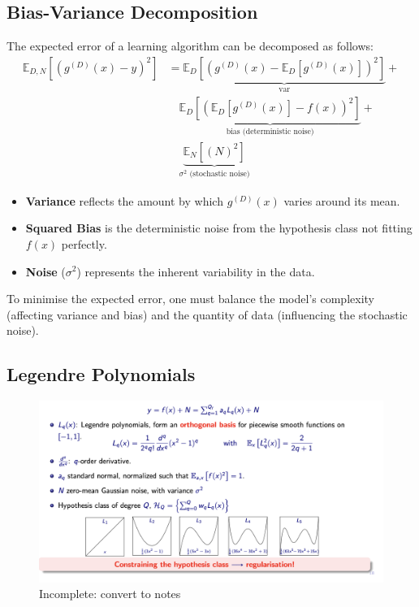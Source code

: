 \subsection*{Bias-Variance Decomposition}
The expected error of a learning algorithm can be decomposed as follows:
\begin{align*}
\mathbb{E}_{D,N} [(g^{(D)}(x) - y)^2] &= \underbrace{\mathbb{E}_{D} [(g^{(D)}(x) - \mathbb{E}_D [g^{(D)}(x)])^2]}_{\text{var}} + \\
&\quad \underbrace{\mathbb{E}_D [(\mathbb{E}_D [g^{(D)}(x)] - f(x))^2]}_{\text{bias (deterministic noise)}} + \\
&\quad \underbrace{\mathbb{E}_N [(N)^2]}_{\sigma^2 \text{ (stochastic noise)}}
\end{align*}

\begin{itemize}
    \item \textbf{Variance} reflects the amount by which \( g^{(D)}(x) \) varies around its mean.
    \item \textbf{Squared Bias} is the deterministic noise from the hypothesis class not fitting \( f(x) \) perfectly.
    \item \textbf{Noise} (\( \sigma^2 \)) represents the inherent variability in the data.
\end{itemize}

To minimise the expected error, one must balance the model's complexity (affecting variance and bias) and the quantity of data (influencing the stochastic noise).


\subsection{Legendre Polynomials}
\begin{figure}[H]
    \centering
    \includegraphics[width=1\linewidth]{img/legendre_slide.png}
    \caption{Incomplete: convert to notes}
    
\end{figure}

